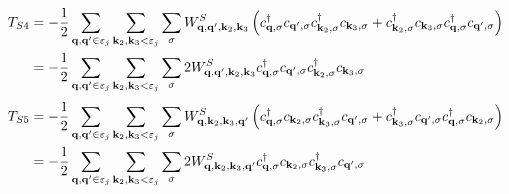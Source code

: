 \documentclass{revtex4-2}
\begin{document}
\begin{equation}\begin{aligned}
	T_{S4} &= - \frac{1}{2}\sum_{{\bf q}, {\bf q}^\prime \in \varepsilon_j}\sum_{{\bf k}_2, {\bf k}_3 < \varepsilon_j}\sum_{\sigma}W^S_{{\bf q},{\bf q}^\prime,{\bf k}_2,{\bf k}_3} \left(c^\dagger_{{\bf q},\sigma}c_{{\bf q}^\prime,\sigma}c^\dagger_{{\bf k}_2,\sigma}c_{{\bf k}_3,\sigma} + c^\dagger_{{\bf k}_2,\sigma}c_{{\bf k}_3,\sigma}c^\dagger_{{\bf q},\sigma}c_{{\bf q}^\prime,\sigma}\right) \\
				&= - \frac{1}{2}\sum_{{\bf q}, {\bf q}^\prime \in \varepsilon_j}\sum_{{\bf k}_2, {\bf k}_3 < \varepsilon_j}\sum_{\sigma}2W^S_{{\bf q},{\bf q}^\prime,{\bf k}_2,{\bf k}_3} c^\dagger_{{\bf q},\sigma}c_{{\bf q}^\prime,\sigma}c^\dagger_{{\bf k}_2,\sigma}c_{{\bf k}_3,\sigma}\\
\end{aligned}\end{equation}
\begin{equation}\begin{aligned}
	T_{S5} &= - \frac{1}{2}\sum_{{\bf q}, {\bf q}^\prime \in \varepsilon_j}\sum_{{\bf k}_2, {\bf k}_3 < \varepsilon_j}\sum_{\sigma}W^S_{{\bf q},{\bf k}_2,{\bf k}_3,{\bf q}^\prime} \left(c^\dagger_{{\bf q},\sigma}c_{{\bf k}_2,\sigma}c^\dagger_{{\bf k}_3,\sigma}c_{{\bf q}^\prime,\sigma} + c^\dagger_{{\bf k}_3,\sigma}c_{{\bf q}^\prime,\sigma}c^\dagger_{{\bf q},\sigma}c_{{\bf k}_2,\sigma}\right)\\
	       &= - \frac{1}{2}\sum_{{\bf q}, {\bf q}^\prime \in \varepsilon_j}\sum_{{\bf k}_2, {\bf k}_3 < \varepsilon_j}\sum_{\sigma}2W^S_{{\bf q},{\bf k}_2,{\bf k}_3,{\bf q}^\prime} c^\dagger_{{\bf q},\sigma}c_{{\bf k}_2,\sigma}c^\dagger_{{\bf k}_3,\sigma}c_{{\bf q}^\prime,\sigma}\\
\end{aligned}\end{equation}
\end{document}
